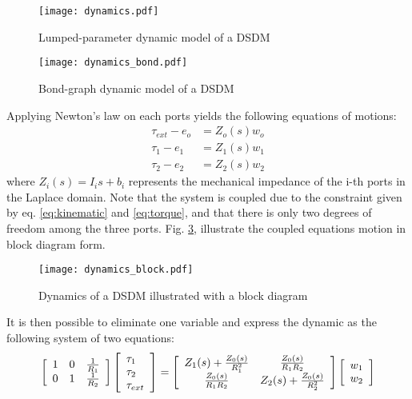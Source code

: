 \begin{figure}[htb]
	\centering
		\texttt{[image: dynamics.pdf]}
	\caption{Lumped-parameter dynamic model of a DSDM}
	\label{fig:dynamics}
\end{figure}

\begin{figure}[htb]
	\centering
		\texttt{[image: dynamics\_bond.pdf]}
	\caption{Bond-graph dynamic model of a DSDM}
	\label{fig:dynamics_bond}
\end{figure}

Applying Newton's law on each ports yields the following equations of motions:
%
\begin{align}
\tau_{ext}  - e_o &= Z_o(s) w_o \\
\tau_{1}    - e_1 &= Z_1(s) w_1 \\
\tau_{2}    - e_2 &= Z_2(s) w_2
\end{align}
%
where $Z_i(s) = I_i s + b_i$ represents the mechanical impedance of the i-th ports in the Laplace domain. Note that the system is coupled due to the constraint given by eq. \eqref{eq:kinematic} and \eqref{eq:torque}, and that there is only two degrees of freedom among the three ports. Fig. \ref{fig:dynamics_block}, illustrate the coupled equations motion in block diagram form.
%
\begin{figure}[htp]
	\centering
		\texttt{[image: dynamics\_block.pdf]}
	\caption{Dynamics of a DSDM illustrated with a block diagram}
	\label{fig:dynamics_block}
\end{figure}
%
It is then possible to eliminate one variable and express the dynamic as the following system of two equations:
%
\begin{align}
\left[
\begin{array}{c c c}
 1 & 0 & \frac{1}{R_1} \\
 0 & 1 & \frac{1}{R_2}
\end{array}
\right]
\left[
\begin{array}{l}
 \tau_{1} \\
 \tau_{2} \\
 \tau_{ext}
\end{array}
\right]
=
\left[
\begin{array}{c c}
 Z_1(s) + \frac{Z_0(s)}{R_1^2} & \frac{Z_0(s)}{R_1 R_2}        \\
 \frac{Z_0(s)}{R_1 R_2}        & Z_2(s) + \frac{Z_0(s)}{R_2^2} \\
\end{array}
\right]
\left[
\begin{array}{l}
w_1     \\
w_2     \\
\end{array}
\right]
\end{align}
